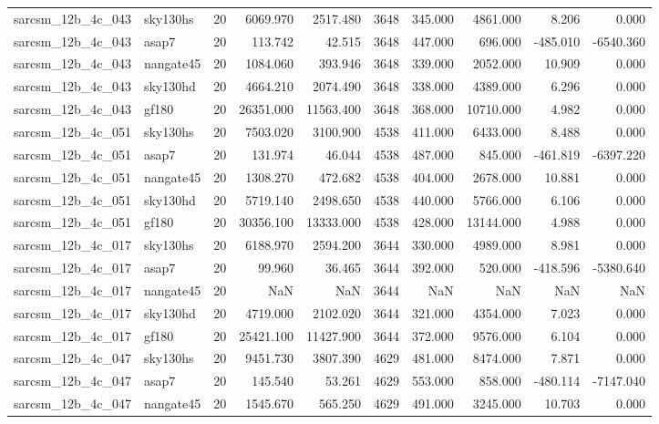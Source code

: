 \begin{tabular}{llrrrrrrrr}
sarcsm\_12b\_4c\_043 & sky130hs & 20 & 6069.970 & 2517.480 & 3648 & 345.000 & 4861.000 & 8.206 & 0.000 \\
sarcsm\_12b\_4c\_043 & asap7 & 20 & 113.742 & 42.515 & 3648 & 447.000 & 696.000 & -485.010 & -6540.360 \\
sarcsm\_12b\_4c\_043 & nangate45 & 20 & 1084.060 & 393.946 & 3648 & 339.000 & 2052.000 & 10.909 & 0.000 \\
sarcsm\_12b\_4c\_043 & sky130hd & 20 & 4664.210 & 2074.490 & 3648 & 338.000 & 4389.000 & 6.296 & 0.000 \\
sarcsm\_12b\_4c\_043 & gf180 & 20 & 26351.000 & 11563.400 & 3648 & 368.000 & 10710.000 & 4.982 & 0.000 \\
sarcsm\_12b\_4c\_051 & sky130hs & 20 & 7503.020 & 3100.900 & 4538 & 411.000 & 6433.000 & 8.488 & 0.000 \\
sarcsm\_12b\_4c\_051 & asap7 & 20 & 131.974 & 46.044 & 4538 & 487.000 & 845.000 & -461.819 & -6397.220 \\
sarcsm\_12b\_4c\_051 & nangate45 & 20 & 1308.270 & 472.682 & 4538 & 404.000 & 2678.000 & 10.881 & 0.000 \\
sarcsm\_12b\_4c\_051 & sky130hd & 20 & 5719.140 & 2498.650 & 4538 & 440.000 & 5766.000 & 6.106 & 0.000 \\
sarcsm\_12b\_4c\_051 & gf180 & 20 & 30356.100 & 13333.000 & 4538 & 428.000 & 13144.000 & 4.988 & 0.000 \\
sarcsm\_12b\_4c\_017 & sky130hs & 20 & 6188.970 & 2594.200 & 3644 & 330.000 & 4989.000 & 8.981 & 0.000 \\
sarcsm\_12b\_4c\_017 & asap7 & 20 & 99.960 & 36.465 & 3644 & 392.000 & 520.000 & -418.596 & -5380.640 \\
sarcsm\_12b\_4c\_017 & nangate45 & 20 & NaN & NaN & 3644 & NaN & NaN & NaN & NaN \\
sarcsm\_12b\_4c\_017 & sky130hd & 20 & 4719.000 & 2102.020 & 3644 & 321.000 & 4354.000 & 7.023 & 0.000 \\
sarcsm\_12b\_4c\_017 & gf180 & 20 & 25421.100 & 11427.900 & 3644 & 372.000 & 9576.000 & 6.104 & 0.000 \\
sarcsm\_12b\_4c\_047 & sky130hs & 20 & 9451.730 & 3807.390 & 4629 & 481.000 & 8474.000 & 7.871 & 0.000 \\
sarcsm\_12b\_4c\_047 & asap7 & 20 & 145.540 & 53.261 & 4629 & 553.000 & 858.000 & -480.114 & -7147.040 \\
sarcsm\_12b\_4c\_047 & nangate45 & 20 & 1545.670 & 565.250 & 4629 & 491.000 & 3245.000 & 10.703 & 0.000 \\

\end{tabular}
